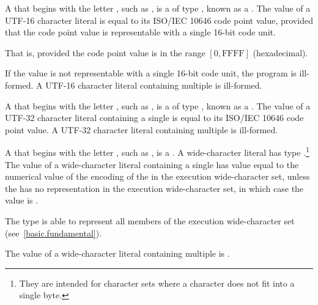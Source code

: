 \pnum
{}%
%
A  that
begins with the letter , such as ,
%
is a  of type ,
known as a .
The value of a UTF-16 character literal
is equal to its ISO/IEC 10646 code point value,
provided that the code point value is
representable with a single 16-bit code unit.
\begin{note}
That is, provided the code point value is in the range $[0, \mathrm{FFFF}]$ (hexadecimal).
\end{note}
If the value is not representable
with a single 16-bit code unit, the program is ill-formed.
A UTF-16 character literal
containing multiple  is ill-formed.

\pnum
{}%
%
A  that
begins with the letter , such as ,
%
is a  of type ,
known as a .
The value of a
UTF-32 character literal containing a single  is equal
to its ISO/IEC 10646 code point value.
A UTF-32 character literal containing
multiple  is ill-formed.

\pnum
{}%
%
%
%
A  that
begins with the letter , such as ,
%
is a . A wide-character literal has type
.\footnote{They are intended for character sets where a character does
not fit into a single byte. }
The value of a wide-character literal containing a single
 has value equal to the numerical value of the encoding
of the  in the execution wide-character set, unless the
 has no representation in the execution wide-character set, in which
case the value is .
\begin{note}
The type  is able to
represent all members of the execution wide-character set (see~\ref{basic.fundamental}).
\end{note}
The value
of a wide-character literal containing multiple  is
.

